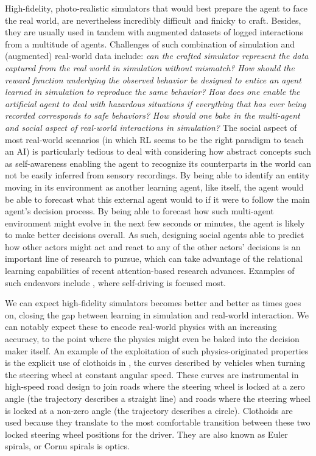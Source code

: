 High-fidelity, photo-realistic simulators that would best prepare the agent to face the real world,
are nevertheless incredibly difficult and finicky to craft.
Besides, they are usually used in tandem with augmented datasets of logged interactions from
a multitude of agents.
Challenges of such combination of simulation and (augmented) real-world data include:
\emph{can the crafted simulator represent the data captured from the real world in simulation
without mismatch?}
\emph{How should the reward function underlying the observed behavior be designed
to entice an agent learned in simulation to reproduce the same behavior?}
\emph{How does one enable the artificial agent to deal with hazardous situations if
everything that has ever being recorded corresponds to safe behaviors?}
\emph{How should one bake in the multi-agent and social aspect of real-world interactions in simulation?}
The social aspect of most real-world scenarios (in which RL seems to be the right paradigm to teach an AI)
is particularly tedious to deal with considering how abstract concepts such as self-awareness enabling the agent
to recognize its counterparts in the world can not be easily inferred from sensory recordings.
By being able to identify an entity moving in its environment as another learning agent, like itself,
the agent would be able to forecast what this external agent would to if it were to follow the main agent's
decision process. By being able to forecast how such multi-agent environment might evolve
in the next few seconds or minutes, the agent is likely to make better decisions overall.
As such, designing social agents able to predict how other actors might act and react to
any of the other actors' decisions is an important line of research to pursue,
which can take advantage of the relational learning capabilities of recent attention-based research advances.
Examples of such endeavors include
\cite{Bradley_Knox2013-jg,Alahi2016-vi,Leibo2017-lg,Tai2017-wq,Vemula2017-zd,
Li2018-wc,Gupta2018-cu,Kosaraju2019-ui,Zhou2020-hs,Ndousse2020-oz},
where self-driving is focused most.

We can expect high-fidelity simulators becomes better and better as times goes on,
closing the gap between learning in simulation and real-world interaction.
We can notably expect these to encode real-world physics with an increasing accuracy,
to the point where the physics might even be baked into the decision maker itself.
An example of the exploitation of such physics-originated properties is the explicit use
of clothoids in \cite{Zeng2020-co}, the curves described by vehicles when turning the steering wheel at
constant angular speed.
These curves are instrumental in high-speed road design to join roads where the steering wheel is locked
at a zero angle (the trajectory describes a straight line) and roads where the steering wheel is locked at a
non-zero angle (the trajectory describes a circle).
Clothoids are used because they translate to the most comfortable transition between these two
locked steering wheel positions for the driver.
They are also known as Euler spirals, or Cornu spirals is optics.

